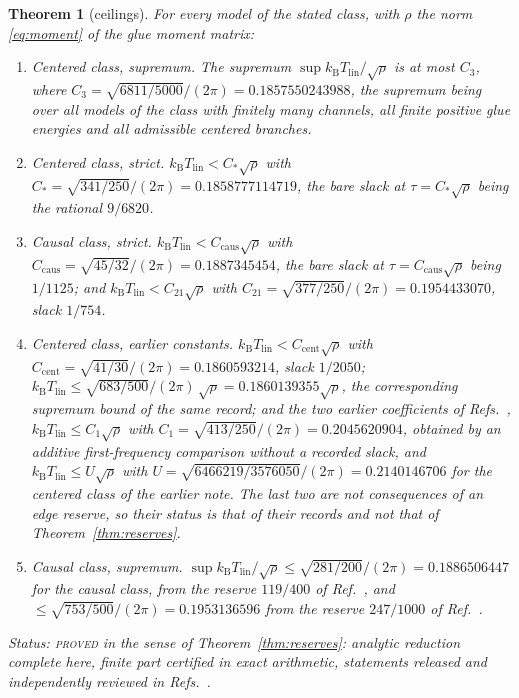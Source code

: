 \documentclass[aps,10pt,superscriptaddress,floatfix,amsmath,amssymb,nofootinbib]{revtex4-2}
\newcommand{\kb}{k_{\mathrm B}}
\newcommand{\Tlin}{T_{\mathrm{lin}}}
\newcommand{\Cthree}{C_{3}}
\newcommand{\Cstar}{C_{*}}
\newcommand{\Ccent}{C_{\mathrm{cent}}}
\newcommand{\Ccaus}{C_{\mathrm{caus}}}
\newcommand{\Ctwoone}{C_{21}}
\newcommand{\Cone}{C_{1}}
\newcommand{\Upre}{U}
\newcommand{\PROVED}{\textsc{proved}}
\newtheorem{theorem}{Theorem}
\begin{document}
\begin{theorem}[ceilings]\label{thm:ceil}
For every model of the stated class, with $\rho$ the norm \eqref{eq:moment} of the glue
moment matrix:
\begin{enumerate}
\item[\rm(a)] \emph{Centered class, supremum.}
The supremum $\sup\kb\Tlin/\sqrt\rho$ is at most $\Cthree$, where
$\Cthree=\sqrt{6811/5000}/(2\pi)=0.1857550243988$, the supremum being over all models of the
class with finitely many channels, all finite positive glue energies and all admissible
centered branches.
\item[\rm(b)] \emph{Centered class, strict.}
$\kb\Tlin<\Cstar\sqrt\rho$ with $\Cstar=\sqrt{341/250}/(2\pi)=0.1858777114719$, the bare
slack at $\tau=\Cstar\sqrt\rho$ being the rational $9/6820$.
\item[\rm(c)] \emph{Causal class, strict.}
$\kb\Tlin<\Ccaus\sqrt\rho$ with $\Ccaus=\sqrt{45/32}/(2\pi)=0.1887345454$, the bare slack at
$\tau=\Ccaus\sqrt\rho$ being $1/1125$; and $\kb\Tlin<\Ctwoone\sqrt\rho$ with
$\Ctwoone=\sqrt{377/250}/(2\pi)=0.1954433070$, slack $1/754$.
\item[\rm(d)] \emph{Centered class, earlier constants.}
$\kb\Tlin<\Ccent\sqrt\rho$ with $\Ccent=\sqrt{41/30}/(2\pi)=0.1860593214$, slack $1/2050$;
$\kb\Tlin\le\sqrt{683/500}/(2\pi)\,\sqrt\rho=0.1860139355\sqrt\rho$, the corresponding
supremum bound of the same record; and the two earlier coefficients of
Refs.~\cite{univglue,optimum}, $\kb\Tlin\le\Cone\sqrt\rho$ with
$\Cone=\sqrt{413/250}/(2\pi)=0.2045620904$, obtained by an additive first-frequency
comparison without a recorded slack, and $\kb\Tlin\le\Upre\sqrt\rho$ with
$\Upre=\sqrt{6466219/3576050}/(2\pi)=0.2140146706$ for the centered class of the earlier
note. The last two are not consequences of an edge reserve, so their status is that of their
records and not that of Theorem~\ref{thm:reserves}.
\item[\rm(e)] \emph{Causal class, supremum.}
$\sup\kb\Tlin/\sqrt\rho\le\sqrt{281/200}/(2\pi)=0.1886506447$ for the causal class, from
the reserve $119/400$ of Ref.~\cite{finiteenergy}, and
$\le\sqrt{753/500}/(2\pi)=0.1953136596$ from the reserve $247/1000$ of
Ref.~\cite{optimum}.
\end{enumerate}
Status: \PROVED{} in the sense of Theorem~\ref{thm:reserves}: analytic reduction complete
here, finite part certified in exact arithmetic, statements released and independently
reviewed in Refs.~\cite{univglue,optimum,finiteenergy,anisosharp}.
\end{theorem}
\end{document}
